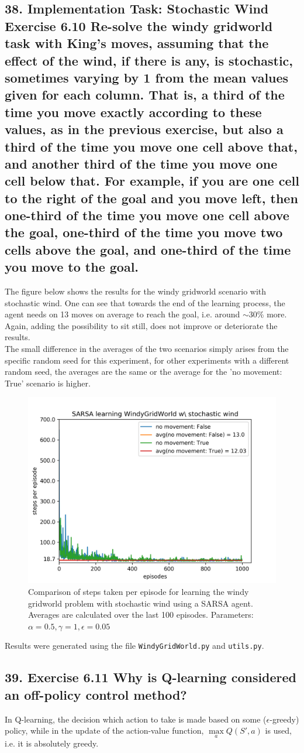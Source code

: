 \subsection*{38. Implementation Task: Stochastic Wind Exercise 6.10 Re-solve the windy gridworld task with King's moves, assuming that the effect of the wind, if there is any, is stochastic, sometimes varying by 1 from the mean values given for each column. That is, a third of the time you move exactly according to these values, as in the previous exercise, but also a third of the time you move one cell above that, and another third of the time you move one cell below that. For example, if you are one cell to the right of the goal and you move left, then one-third of the time you move one cell above the goal, one-third of the time you move two cells above the goal, and one-third of the time you move to the goal.}
The figure below shows the results for the windy gridworld scenario with stochastic wind. One can see that towards the end of the learning process, the agent needs on 13 moves on average to reach the goal, i.e. around $\sim$30\% more.
Again, adding the possibility to sit still, does not improve or deteriorate the results.\\The small difference in the averages of the two scenarios simply arises from the specific random seed for this experiment, for other experiments with a different random seed, the averages are the same or the average for the 'no movement: True' scenario is higher.
\begin{figure}[H]
\centering
\captionsetup{width=.5\linewidth}
\includegraphics[width=.5\linewidth]{./WindyGridWorld_stochastic_wind.png}
\caption{Comparison of steps taken per episode for learning the windy gridworld problem with stochastic wind using a SARSA agent. Averages are calculated over the last 100 episodes. Parameters: $\alpha = 0.5, \gamma = 1, \epsilon = 0.05$}
\end{figure}
Results were generated using the file \texttt{WindyGridWorld.py} and \texttt{utils.py}.
\subsection*{39. Exercise 6.11 Why is Q-learning considered an off-policy control method?}
In Q-learning, the decision which action to take is made based on some ($\epsilon$-greedy) policy, while in the update of the action-value function, $\underset{a}{\operatorname{max}}Q(S', a)$ is used, i.e. it is absolutely greedy.

